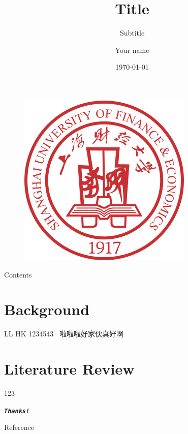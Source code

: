\documentclass[UTF8, 16pt]{beamer}
\author[XXX] %
{
Your name
}
\title[Title]{Title}
\subtitle{Subtitle}
\institute[SUFE]
{
Shanghai University of Finance and Economics
}
\date{\today}
\begin{document}
\begin{CJK*}{UTF8}{gbsn}

	\begin{frame}[noframenumbering]
		\titlepage{}
		\vspace{-0.5cm}
		\begin{figure}[htpb]
			\begin{center}
				\includegraphics[width=0.19 \linewidth]{sufe_logo.png}
			\end{center}
		\end{figure}
	\end{frame}

	\begin{frame}{Contents}
		\tableofcontents[sectionstyle=show,
			subsectionstyle=show/shaded/hide,
			subsubsectionstyle=show/shaded/hide]
	\end{frame}

	\section{Background}

	\begin{frame}{LL}
		\textcolor{sufered}{HK}
		1234543~\cite{origin}
		啦啦啦好家伙真好啊
	\end{frame}

	\section{Literature Review}
	\begin{frame}
		123
	\end{frame}



	\begin{frame}[allowframebreaks]%
		\begin{center}
			\Huge\textbf{\textit{\texttt{Thanks!}}}
		\end{center}
	\end{frame}

	\begin{frame}{Reference}
		\addtocounter{framenumber}{-1}
		\printbibliography{} %
	\end{frame}


\end{CJK*}
\end{document}
